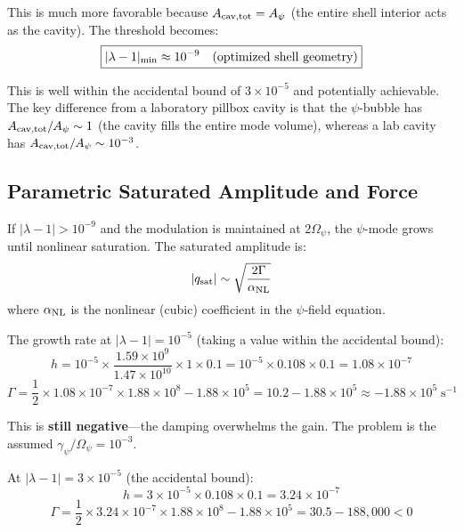 \documentclass[12pt,letterpaper]{article}
\begin{document}
This is much more favorable because $A_{\rm cav,tot} = A_\psi$ (the entire shell
interior acts as the cavity). The threshold becomes:
\begin{equation}
\boxed{|\lambda - 1|_{\rm min} \approx 10^{-9} \quad \text{(optimized shell geometry)}}
\end{equation}

This is well within the accidental bound of $3 \times 10^{-5}$ and potentially
achievable. The key difference from a laboratory pillbox cavity is that the
$\psi$-bubble has $A_{\rm cav,tot} / A_\psi \sim 1$ (the cavity fills the entire
mode volume), whereas a lab cavity has $A_{\rm cav,tot}/A_\psi \sim 10^{-3}$.

\subsection{Parametric Saturated Amplitude and Force}

If $|\lambda - 1| > 10^{-9}$ and the modulation is maintained at $2\Omega_\psi$,
the $\psi$-mode grows until nonlinear saturation. The saturated amplitude is:
\begin{equation}
|q_{\rm sat}| \sim \sqrt{\frac{2\Gamma}{\alpha_{\rm NL}}}
\end{equation}
where $\alpha_{\rm NL}$ is the nonlinear (cubic) coefficient in the $\psi$-field
equation.

The growth rate at $|\lambda - 1| = 10^{-5}$ (taking a value within the
accidental bound):
\begin{equation}
h = 10^{-5} \times \frac{1.59 \times 10^9}{1.47 \times 10^{10}} \times 1 \times 0.1
= 10^{-5} \times 0.108 \times 0.1 = 1.08 \times 10^{-7}
\end{equation}
\begin{equation}
\Gamma = \frac{1}{2} \times 1.08 \times 10^{-7} \times 1.88 \times 10^8 - 1.88 \times 10^5
= 10.2 - 1.88 \times 10^5 \approx -1.88 \times 10^5\;\text{s}^{-1}
\end{equation}

This is \textbf{still negative}---the damping overwhelms the gain. The problem
is the assumed $\gamma_\psi/\Omega_\psi = 10^{-3}$.

At $|\lambda - 1| = 3 \times 10^{-5}$ (the accidental bound):
\begin{equation}
h = 3 \times 10^{-5} \times 0.108 \times 0.1 = 3.24 \times 10^{-7}
\end{equation}
\begin{equation}
\Gamma = \frac{1}{2} \times 3.24 \times 10^{-7} \times 1.88 \times 10^8 - 1.88 \times 10^5 = 30.5 - 188{,}000 < 0
\end{equation}
\end{document}
